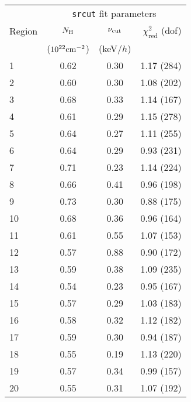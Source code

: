 \begin{tabular}{@{} lccr @{}}
\toprule
{} & \multicolumn{3}{c}{\texttt{srcut} fit parameters} \\
\cmidrule(lr){2-4}
Region & $N_{\mathrm{H}}$ & $\nu_{\mathrm{cut}}$ & $\chi^2_{\mathrm{red}}$ (dof) \\
{}     & ($10^{22} \mathrm{cm}^{-2}$) & (keV/$h$) & {} \\
\midrule
 1 & 0.62 & 0.30 & 1.17 (284) \\
 2 & 0.60 & 0.30 & 1.08 (202) \\
 3 & 0.68 & 0.33 & 1.14 (167) \\
\cmidrule{1-4}
 4 & 0.61 & 0.29 & 1.15 (278) \\
 5 & 0.64 & 0.27 & 1.11 (255) \\
 6 & 0.64 & 0.29 & 0.93 (231) \\
 7 & 0.71 & 0.23 & 1.14 (224) \\
 8 & 0.66 & 0.41 & 0.96 (198) \\
 9 & 0.73 & 0.30 & 0.88 (175) \\
10 & 0.68 & 0.36 & 0.96 (164) \\
\cmidrule{1-4}
11 & 0.61 & 0.55 & 1.07 (153) \\
12 & 0.57 & 0.88 & 0.90 (172) \\
13 & 0.59 & 0.38 & 1.09 (235) \\
\cmidrule{1-4}
14 & 0.54 & 0.23 & 0.95 (167) \\
15 & 0.57 & 0.29 & 1.03 (183) \\
16 & 0.58 & 0.32 & 1.12 (182) \\
17 & 0.59 & 0.30 & 0.94 (187) \\
\cmidrule{1-4}
18 & 0.55 & 0.19 & 1.13 (220) \\
19 & 0.57 & 0.34 & 0.99 (157) \\
20 & 0.55 & 0.31 & 1.07 (192) \\
\bottomrule
\end{tabular}
